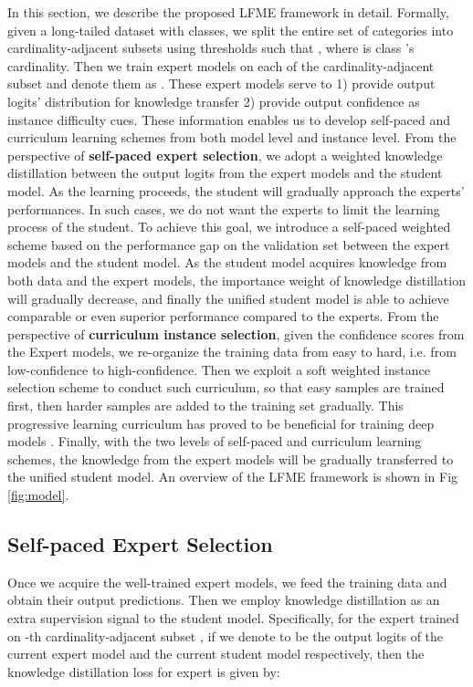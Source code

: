 \documentclass[runningheads]{llncs}
\begin{document}
	
	In this section, we describe the proposed LFME framework in detail. Formally, given a long-tailed dataset  with  classes, we split the entire set of categories into  cardinality-adjacent subsets  using  thresholds  such that , where  is class 's cardinality. 
	Then we train  expert models on each of the cardinality-adjacent subset and denote them as . These expert models serve to 1) provide output logits' distribution for knowledge transfer 2) provide output confidence as instance difficulty cues. 
	These information enables us to develop self-paced and curriculum learning schemes from both model level and instance level. From the perspective of \textbf{self-paced expert selection}, we adopt a weighted knowledge distillation between the output logits from the expert models and the student model. As the learning proceeds, the student will gradually approach the experts' performances. In such cases, we do not want the experts to limit the learning process of the student. To achieve this goal, we introduce a self-paced weighted scheme based on the  performance gap on the validation set between the expert models and the student model. As the student model acquires knowledge from both data and the expert models, the importance weight of knowledge distillation will gradually decrease, and finally the unified student model is able to achieve comparable or even superior performance compared to the experts. From the perspective of \textbf{curriculum instance selection}, given the confidence scores from the Expert models, we re-organize the training data from easy to hard, i.e. from low-confidence to high-confidence. Then we exploit a soft weighted instance selection scheme to conduct such curriculum, so that easy samples are trained first, then harder samples are added to the training set gradually. This progressive learning curriculum has proved to be beneficial for training deep models \cite{bengio2009curriculum}. Finally, with the two levels of self-paced and curriculum learning schemes, the knowledge from the expert models will be gradually transferred to the unified student model.
	An overview of the LFME framework is shown in Fig \ref{fig:model}. 
	
	\subsection{Self-paced Expert Selection}
	Once we acquire the well-trained expert models, we feed the training data and obtain their output predictions. Then we employ knowledge distillation as an extra supervision signal to the student model. 
	Specifically, for the expert  trained on -th cardinality-adjacent subset , 
	if we denote  to be the output logits of the current expert model and the current student model respectively, then the knowledge distillation loss for expert  is given by: 
	
\end{document}
